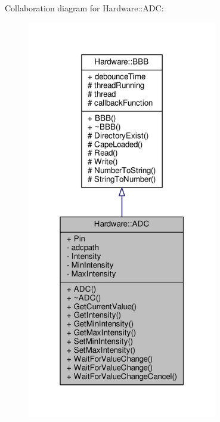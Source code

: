 Collaboration diagram for Hardware\+:\+:A\+D\+C\+:
\nopagebreak
\begin{figure}[H]
\begin{center}
\leavevmode
\includegraphics[width=235pt]{class_hardware_1_1_a_d_c__coll__graph}
\end{center}
\end{figure}
